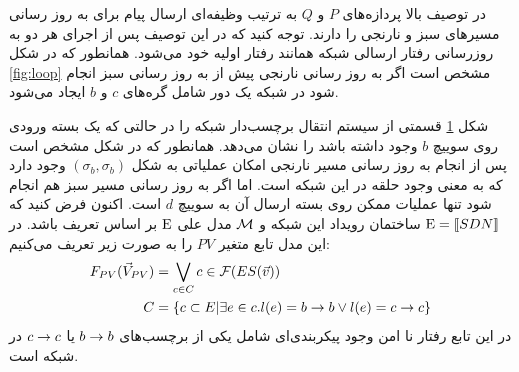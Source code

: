 در توصیف بالا پردازه‌های
$P$
و
$Q$
به ترتیب وظیفه‌ای ارسال پیام برای به روز رسانی مسیر‌های سبز و نارنجی را دارند.
توجه کنید که در این توصیف پس از اجرای هر دو به روزرسانی رفتار ارسالی شبکه همانند رفتار اولیه خود می‌شود.
همانطور که در شکل
\ref{fig:loop}
مشخص است اگر به روز رسانی نارنجی پیش از به روز رسانی سبز انجام شود در شبکه یک دور شامل گره‌های
$c$
و
$b$
ایجاد می‌شود.
\begin{figure}
    \centering
    \caption{}
    \label{fig:loop:lts}
\end{figure}
شکل
\ref{fig:loop:lts}
قسمتی از سیستم انتقال برچسب‌دار شبکه را در حالتی که یک بسته ورودی روی سوییچ 
$b$
وجود داشته باشد را نشان می‌دهد.
همانطور که در شکل مشخص است پس از انجام به روز رسانی مسیر نارنجی امکان عملیاتی به شکل 
$(\sigma_b,\sigma_b)$
وجود دارد که به معنی وجود حلقه در این شبکه است. 
اما اگر به روز رسانی مسیر سبز هم انجام شود تنها عملیات ممکن روی بسته ارسال آن به سوییچ 
$d$
است.
اکنون فرض کنید که
$\mathrm{E} = \llbracket SDN \rrbracket$
ساختمان رویداد این شبکه و
$\mathcal{M}$
مدل علی
$\mathrm{E}$
بر اساس تعریف
باشد.
در این مدل تابع متغیر
$PV$
را به صورت زیر تعریف می‌کنیم:
\begin{align*}
    F_{PV}(\vec V_{PV}) & = \bigvee_{c \in C} c \in \mathcal{F}(ES(\vec v)) \\
    C      & = \{c \subset E | \exists e \in c.
        l(e) = b\rightarrow b \vee l(e) = c\rightarrow c \}
\end{align*}
در این تابع رفتار نا امن وجود پیکربندی‌ای شامل یکی از برچسب‌های
$b \rightarrow b$
یا
$c \rightarrow c$
در شبکه است.
